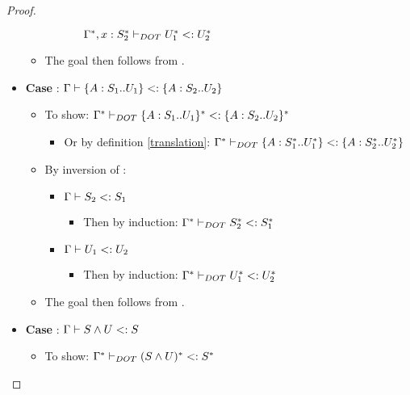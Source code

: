 \begin{proof}
\begin{itemize}
\begin{itemize}
\begin{itemize}
\begin{itemize}
                        $\Gamma^{*}, x:
                        S_2^{*} \vdash_{DOT} U_1^{*} <: U_2^{*}$
                \end{itemize}
            \end{itemize}
            \item The goal then follows from .
        \end{itemize}
        \item \textbf{Case} :
            $\Gamma \vdash \{A : S_1 .. U_1\} <: \{A : S_2 .. U_2\}$
        \begin{itemize}
            \item To show: $\Gamma^{*} \vdash_{DOT} \{A : S_1 .. U_1\}^{*} <: \{A : S_2 .. U_2\}^{*}$
            \begin{itemize}
                \item Or by definition \ref{translation}:
                    $\Gamma^{*} \vdash_{DOT} \{A : S_1^{*} .. U_1^{*}\} <: \{A : S_2^{*} .. U_2^{*}\}$
            \end{itemize}
            \item By inversion of :
            \begin{itemize}
                \item $\Gamma \vdash S_2 <: S_1$
                \begin{itemize}
                    \item Then by induction:
                        $\Gamma^{*} \vdash_{DOT} S_2^{*} <: S_1^{*}$
                \end{itemize}
                \item $\Gamma \vdash U_1 <: U_2$
                \begin{itemize}
                    \item Then by induction:
                        $\Gamma^{*} \vdash_{DOT} U_1^{*} <: U_2^{*}$
                \end{itemize}
            \end{itemize}
            \item The goal then follows from .
        \end{itemize}
        \item \textbf{Case} : $\Gamma \vdash S \wedge U <: S$
        \begin{itemize}
            \item To show:
                $\Gamma^{*} \vdash_{DOT} (S \wedge U)^{*} <: S^{*}$

\end{itemize}
\end{itemize}
\end{proof}
